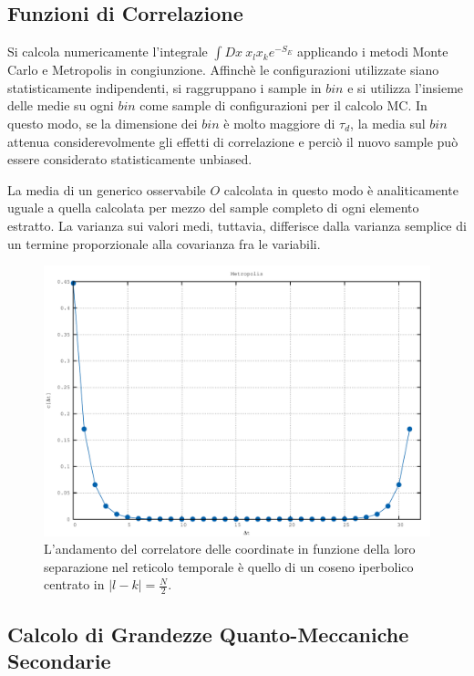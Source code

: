 \subsection{Funzioni di Correlazione}

Si calcola numericamente l'integrale $\int Dx \ x_lx_ke^{-S_E}$ applicando i metodi Monte Carlo e Metropolis in congiunzione. Affinchè le configurazioni utilizzate siano statisticamente indipendenti, si raggruppano i sample in $bin$ e si utilizza l'insieme delle medie su ogni $bin$ come sample di configurazioni per il calcolo MC. In questo modo, se la dimensione dei $bin$ è molto maggiore di $\tau_d$, la media sul $bin$ attenua considerevolmente gli effetti di correlazione e perciò il nuovo sample può essere considerato statisticamente unbiased.

La media di un generico osservabile $O$ calcolata in questo modo è analiticamente uguale a quella calcolata per mezzo del sample completo di ogni elemento estratto. La varianza sui valori medi, tuttavia, differisce dalla varianza semplice di un termine proporzionale alla covarianza fra le variabili.

\begin{figure}[H]
\centering
\includegraphics[width=\textwidth]{correlation}
\caption{L'andamento del correlatore delle coordinate in funzione della loro separazione nel reticolo temporale è quello di un coseno iperbolico centrato in $|l-k|=\tfrac{N}{2}$.}
\label{fig:correlation}
\end{figure}

\subsection{Calcolo di Grandezze Quanto-Meccaniche Secondarie}

